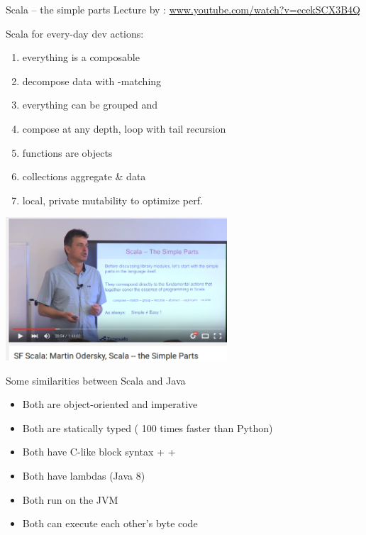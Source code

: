 \documentclass{lecturenotes}
\begin{document}
\begin{Slide}{Scala -- the simple parts}
\fontsize{9}{11}\selectfont
Lecture by : \href{https://www.youtube.com/watch?v=ecekSCX3B4Q}{www.youtube.com/watch?v=ecekSCX3B4Q}

\begin{multicols}{2}
\fontsize{9}{11}\selectfont
Scala for every-day dev actions:

\begin{enumerate}
\item {} everything is a composable 
\item {} decompose data with -matching
\item {} everything can be grouped and 
\item {} compose at any depth, loop with tail recursion
\item {} functions are objects
\item {} collections aggregate \&  data
\item {} local, private mutability to optimize perf.
\end{enumerate}

\columnbreak

\includegraphics[width=0.62\textwidth]{img/odersky}

\end{multicols}
\end{Slide}

\begin{Slide}{Some similarities between Scala and Java}
\begin{itemize}
\item Both are object-oriented and imperative
\item Both are statically typed (\code{~} 100 times faster than Python)
\item Both have C-like block syntax \code+{ }+
\item Both have lambdas (Java 8)  
\item Both run on the JVM
\item Both can execute each other's byte code
\end{itemize}
\end{Slide}
\end{document}
